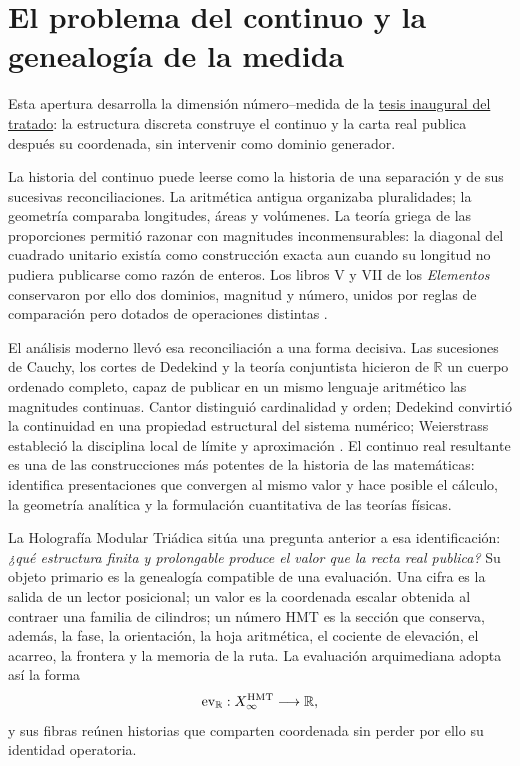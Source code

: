 
\section{El problema del continuo y la genealogía de la medida}
\label{sec:continuo-numero-medida-hmt-revfinal}

Esta apertura desarrolla la dimensión número--medida de la
\hyperref[sec:tesis-inaugural-helicoidal-hmt-md]{tesis inaugural del tratado}:
la estructura discreta construye el continuo y la carta real publica después
su coordenada, sin intervenir como dominio generador.

La historia del continuo puede leerse como la historia de una separación y
de sus sucesivas reconciliaciones. La aritmética antigua organizaba
pluralidades; la geometría comparaba longitudes, áreas y volúmenes. La teoría
griega de las proporciones permitió razonar con magnitudes inconmensurables:
la diagonal del cuadrado unitario existía como construcción exacta aun cuando
su longitud no pudiera publicarse como razón de enteros. Los libros V y VII
de los \emph{Elementos} conservaron por ello dos dominios, magnitud y número,
unidos por reglas de comparación pero dotados de operaciones distintas
\cite{EuclidElements,SEPAristotleMath}.

El análisis moderno llevó esa reconciliación a una forma decisiva. Las
sucesiones de Cauchy, los cortes de Dedekind y la teoría conjuntista hicieron
de \(\mathbb R\) un cuerpo ordenado completo, capaz de publicar en un mismo
lenguaje aritmético las magnitudes continuas. Cantor distinguió cardinalidad
y orden; Dedekind convirtió la continuidad en una propiedad estructural del
sistema numérico; Weierstrass estableció la disciplina local de límite y
aproximación \cite{SEPDedekind,SEPContinuity,SEPSetTheory}. El continuo real
resultante es una de las construcciones más potentes de la historia de las
matemáticas: identifica presentaciones que convergen al mismo valor y hace
posible el cálculo, la geometría analítica y la formulación cuantitativa de
las teorías físicas.

La Holografía Modular Triádica sitúa una pregunta anterior a esa
identificación: \emph{¿qué estructura finita y prolongable produce el valor
que la recta real publica?} Su objeto primario es la genealogía compatible de
una evaluación. Una cifra es la salida de un lector posicional; un valor es
la coordenada escalar obtenida al contraer una familia de cilindros; un número
HMT es la sección que conserva, además, la fase, la orientación, la hoja
aritmética, el cociente de elevación, el acarreo, la frontera y la memoria de
la ruta. La evaluación arquimediana adopta así la forma
\[
 \operatorname{ev}_{\mathbb R}:X_\infty^{\rm HMT}\longrightarrow\mathbb R,
\]
y sus fibras reúnen historias que comparten coordenada sin perder por ello
su identidad operatoria.

